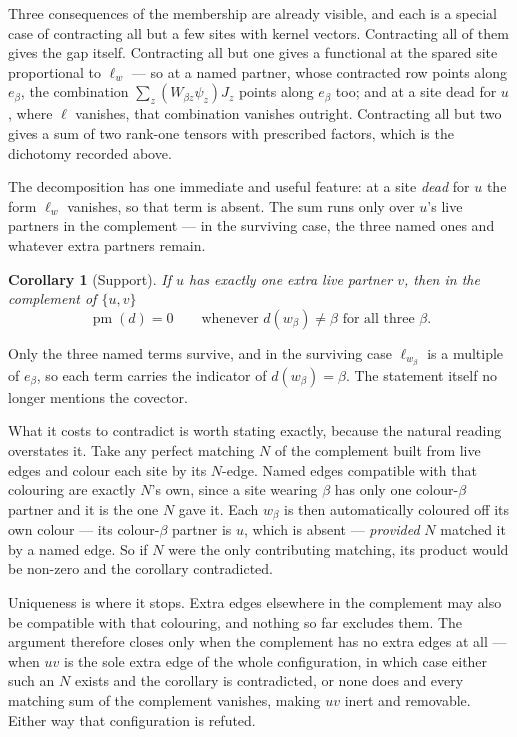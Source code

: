 \documentclass[11pt]{article}
\newtheorem{corollary}[theorem]{Corollary}
\theoremstyle{definition}
\theoremstyle{remark}
\begin{document}
Three consequences of the membership are already visible, and each is a special case of
contracting all but a few sites with kernel vectors. Contracting all of them gives the gap
itself. Contracting all but one gives a functional at the spared site proportional to
$\ell_w$ --- so at a named partner, whose contracted row points along $e_\beta$, the
combination $\sum_z (W_{\beta z}\psi_z)J_z$ points along $e_\beta$ too; and at a site dead
for $u$, where $\ell$ vanishes, that combination vanishes outright. Contracting all but two
gives a sum of two rank-one tensors with prescribed factors, which is the dichotomy
recorded above.

The decomposition has one immediate and useful feature: at a site \emph{dead} for $u$ the
form $\ell_w$ vanishes, so that term is absent. The sum runs only over $u$'s live partners
in the complement --- in the surviving case, the three named ones and whatever extra
partners remain.

\begin{corollary}[Support]\label{cor:support}
If $u$ has exactly one extra live partner $v$, then in the complement of $\{u,v\}$
\[
  \operatorname{pm}(d) = 0
  \qquad\text{whenever } d(w_\beta) \neq \beta \text{ for all three } \beta .
\]
\end{corollary}

Only the three named terms survive, and in the surviving case $\ell_{w_\beta}$ is a
multiple of $e_\beta$, so each term carries the indicator of $d(w_\beta) = \beta$. The
statement itself no longer mentions the covector.

What it costs to contradict is worth stating exactly, because the natural reading
overstates it. Take any perfect matching $N$ of the complement built from live edges and
colour each site by its $N$-edge. Named edges compatible with that colouring are exactly
$N$'s own, since a site wearing $\beta$ has only one colour-$\beta$ partner and it is the
one $N$ gave it. Each $w_\beta$ is then automatically coloured off its own colour --- its
colour-$\beta$ partner is $u$, which is absent --- \emph{provided} $N$ matched it by a
named edge. So if $N$ were the only contributing matching, its product would be non-zero
and the corollary contradicted.

Uniqueness is where it stops. Extra edges elsewhere in the complement may also be
compatible with that colouring, and nothing so far excludes them. The argument therefore
closes only when the complement has no extra edges at all --- when $uv$ is the sole extra
edge of the whole configuration, in which case either such an $N$ exists and the
corollary is contradicted, or none does and every matching sum of the complement vanishes,
making $uv$ inert and removable. Either way that configuration is refuted.
\end{document}
